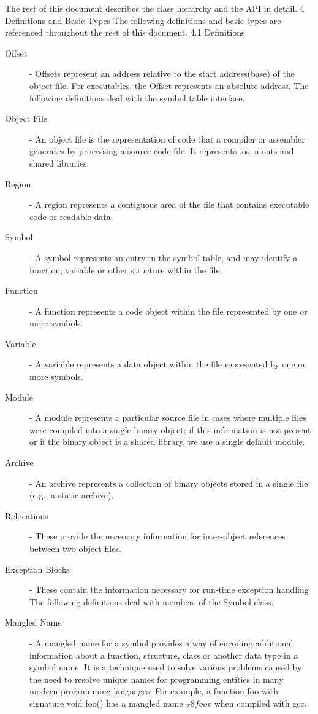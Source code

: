 The rest of this document describes the class hierarchy and the API in detail.
4 Definitions and Basic Types
The following definitions and basic types are referenced throughout the rest of this document.
4.1 Definitions
\begin{description}
\item[Offset] - Offsets represent an address relative to the start address(base) of the object file. For executables, the Offset represents an absolute address.
The following definitions deal with the symbol table interface.
\item[Object File] - An object file is the representation of code that a compiler or assembler generates by processing a source code file. It represents .os, a.outs and shared libraries.
\item[Region] - A region represents a contiguous area of the file that contains executable code or readable data.
\item[Symbol] - A symbol represents an entry in the symbol table, and may identify a function, variable or other structure within the file.
\item[Function] - A function represents a code object within the file represented by one or more symbols.
\item[Variable] - A variable represents a data object within the file represented by one or more symbols.
\item[Module] - A module represents a particular source file in cases where multiple files were compiled into a single binary object; if this information is not present, or if the binary object is a shared library, we use a single default module.
\item[Archive] - An archive represents a collection of binary objects stored in a single file (e.g., a static archive). 
\item[Relocations] - These provide the necessary information for inter-object references between two object files. 
\item[Exception Blocks] - These contain the information necessary for run-time exception handling
The following definitions deal with members of the Symbol class.
\item[Mangled Name] - A mangled name for a symbol provides a way of encoding additional information about a function, structure, class or another data type in a symbol name. It is a technique used to solve various problems caused by the need to resolve unique names for programming entities in many modern programming languages. For example, a function foo with signature void foo() has a mangled name $_Z8foov$ when compiled with gcc.

\end{description}
